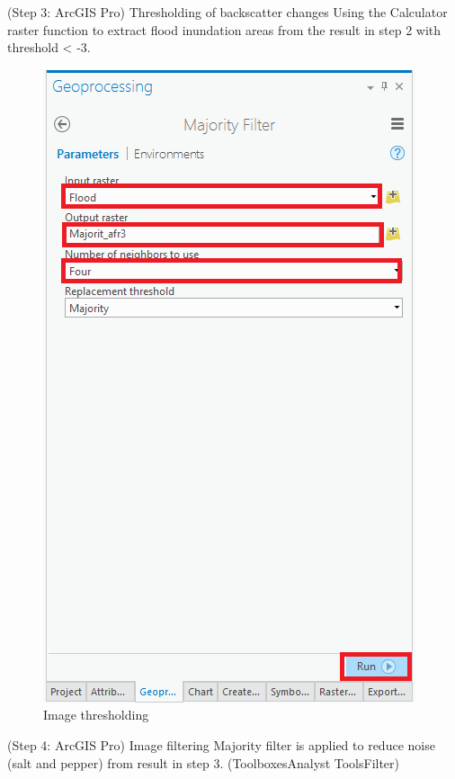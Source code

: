 \documentclass[]{book}
\theoremstyle{definition}
\theoremstyle{definition}
\theoremstyle{definition}
\theoremstyle{remark}
\begin{document}
(Step 3: ArcGIS Pro) Thresholding of backscatter changes Using the
Calculator raster function to extract flood inundation areas from the
result in step 2 with threshold \textless{} -3.

\begin{figure}

{\centering \includegraphics[width=0.7\linewidth]{img/fig42_workflow6} 

}

\caption{Image thresholding}\label{fig:fig42g}
\end{figure}

(Step 4: ArcGIS Pro) Image filtering Majority filter is applied to
reduce noise (salt and pepper) from result in step 3.
(Toolboxes\Spatial Analyst Tools\Generalization\Majority Filter)
\end{document}
